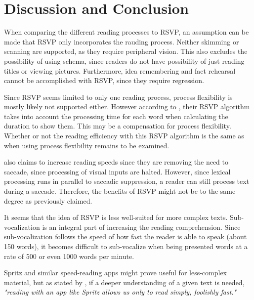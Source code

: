 \section{Discussion and Conclusion}
When comparing the different reading processes to RSVP, an assumption can be made that RSVP only incorporates the rauding process. Neither skimming or scanning are supported, as they require peripheral vision. This also excludes the possibility of using schema, since readers do not have possibility of just reading titles or viewing pictures. Furthermore, idea remembering and fact rehearsal cannot be accomplished with RSVP, since they require regression. 

Since RSVP seems limited to only one reading process, process flexibility is mostly likely not supported either. However according to , their RSVP algorithm takes into account the processing time for each word when calculating the duration to show them. This may be a compensation for process flexibility. Whether or not the reading efficiency with this RSVP algorithm is the same as when using process flexibility remains to be examined.

 also claims to increase reading speeds since they are removing the need to saccade, since processing of visual inputs are halted. However, since lexical processing runs in parallel 
to saccadic suppression, a reader can still process text during a saccade. Therefore, the benefits of RSVP might not be to the same degree as previously claimed.

It seems that the idea of RSVP is less well-suited for more complex texts. Sub-vocalization is an integral part of increasing the reading comprehension. Since sub-vocalization follows the speed of how fast the reader is able to speak (about 150 words), it becomes difficult to sub-vocalize when being presented words at a rate of 500 or even 1000 words per minute. 

Spritz and similar speed-reading apps might prove useful for less-complex material, but as stated by , if a deeper understanding of a given text is needed, \emph{"reading with an app like Spritz allows us only to read simply, foolishly fast."}

